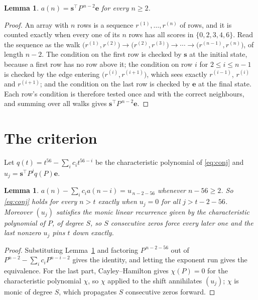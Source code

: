 \documentclass[11pt,a4paper]{article}
\theoremstyle{plain}
\newtheorem{lemma}[theorem]{Lemma}
\theoremstyle{definition}
\begin{document}
\begin{lemma}\label{lem:walk}
$a(n)=\mathbf{s}^{\!\top}P^{\,n-2}\mathbf{e}$ for every $n\ge2$.
\end{lemma}

\begin{proof}
An array with $n$ rows is a sequence $r^{(1)},\dots,r^{(n)}$ of rows, and it is counted
exactly when every one of its $n$ rows has all scores in $\{0,2,3,4,6\}$. Read the sequence as the
walk $\bigl(r^{(1)},r^{(2)}\bigr)\to\bigl(r^{(2)},r^{(3)}\bigr)\to\cdots\to
\bigl(r^{(n-1)},r^{(n)}\bigr)$, of length $n-2$. The condition on the first row is
checked by $\mathbf{s}$ at the initial state, because a first row has no row above it; the
condition on row $i$ for $2\le i\le n-1$ is checked by the edge entering
$\bigl(r^{(i)},r^{(i+1)}\bigr)$, which sees exactly $r^{(i-1)}$, $r^{(i)}$ and
$r^{(i+1)}$; and the condition on the last row is checked by $\mathbf{e}$ at the final
state. Each row's condition is therefore tested once and with the correct neighbours, and
summing over all walks gives $\mathbf{s}^{\!\top}P^{\,n-2}\mathbf{e}$.
\end{proof}

\section{The criterion}

Let $q(t)=t^{56}-\sum_i c_i t^{56-i}$ be the characteristic polynomial of
\eqref{eq:conj} and $u_j=\mathbf{s}^{\!\top}P^{j}q(P)\mathbf{e}$.

\begin{lemma}\label{lem:crit}
$a(n)-\sum_i c_i a(n-i)=u_{\,n-2-56}$ whenever $n-56\ge2$. So \eqref{eq:conj}
holds for every $n>t$ exactly when $u_j=0$ for all $j>t-2-56$. Moreover $(u_j)$
satisfies the monic linear recurrence given by the characteristic polynomial of $P$, of
degree $S$, so $S$ consecutive zeros force every later one and the last nonzero $u_j$ pins
$t$ down exactly.
\end{lemma}

\begin{proof}
Substituting Lemma~\ref{lem:walk} and factoring $P^{\,n-2-56}$ out of
$P^{n-2}-\sum_i c_i P^{n-i-2}$ gives the identity, and letting the exponent run gives the
equivalence. For the last part, Cayley--Hamilton gives $\chi(P)=0$ for the characteristic
polynomial $\chi$, so $\chi$ applied to the shift annihilates $(u_j)$; $\chi$ is monic of
degree $S$, which propagates $S$ consecutive zeros forward.
\end{proof}
\end{document}
